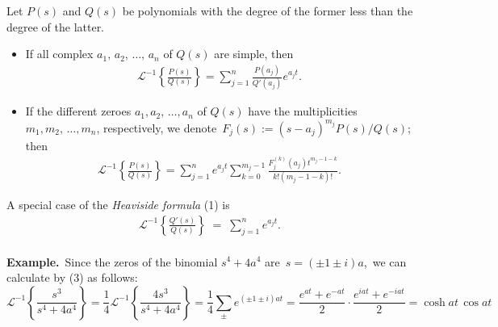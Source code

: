 \documentclass[12pt]{article}
\theoremstyle{definition}
\begin{document}
Let $P(s)$ and $Q(s)$ be polynomials with the degree of the former less than the degree of the latter.
\begin{itemize}
\item If all complex  $a_1,\,a_2,\,\ldots,\,a_n$ of $Q(s)$ are simple, then
\begin{align}
\mathcal{L}^{-1}\left\{\frac{P(s)}{Q(s)}\right\} = \sum_{j=1}^n\frac{P(a_j)}{Q'(a_j)}e^{a_jt}.
\end{align}
\item If the different zeroes $a_1,a_2,\,\ldots,a_n$ of $Q(s)$ 
have the multiplicities $m_1,m_2,\,\ldots,m_n$, respectively, 
we denote\, $F_j(s) := (s\!-\!a_j)^{m_j}P(s)/Q(s)$;\, then
\begin{align}
\mathcal{L}^{-1}\left\{\frac{P(s)}{Q(s)}\right\} = 
\sum_{j=1}^ne^{a_jt}\sum_{k=0}^{m_j-1}\frac{F_j^{(k)}(a_j)t^{m_j\!-\!1\!-\!k}}{k!(m_j\!-\!1\!-\!k)!}.
\end{align}
\end{itemize}
 
A special case of the {\em Heaviside formula} (1) is
\begin{align}
\mathcal{L}^{-1}\left\{\frac{Q'(s)}{Q(s)}\right\} 
\;=\; \sum_{j=1}^ne^{a_jt}.
\end{align}\\

\textbf{Example.}\, Since the zeros of the binomial $s^4\!+\!4a^4$ are\, $s = (\pm1\!\pm\!i)a$,\, we 
can calculate by (3) as follows:
$$\mathcal{L}^{-1}\left\{\frac{s^3}{s^4\!+\!4a^4}\right\} 
= \frac{1}{4}\mathcal{L}^{-1}\left\{\frac{4s^3}{s^4\!+\!4a^4}\right\} = \frac{1}{4}\sum_\pm e^{(\pm 1\pm i)at} 
= \frac{e^{at}+e^{-at}}{2}\cdot\frac{e^{iat}+e^{-iat}}{2} 
= \cosh{at}\,\cos{at}$$\\
\end{document}
